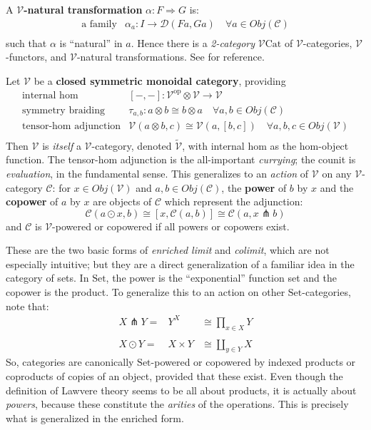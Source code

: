 \documentclass[a4paper,UKenglish]{article}
\theoremstyle{definition}
\newcommand{\Set}{\mathrm{Set}}
\newcommand{\Cat}{\mathrm{Cat}}
\newcommand{\op}{\mathrm{op}}
\newcommand{\V}{\mathscr{V}}
\newcommand{\D}{\mathscr{D}}
\newcommand{\C}{\mathscr{C}}
\newcommand{\pfk}{\pitchfork}
\begin{document}
A \textbf{$\V$-natural transformation} $\alpha: F \Rightarrow G$ is:
\[\begin{array}{rl}
\text{a family} & \alpha_a: I \to \D(Fa,Ga) \quad \forall a \in Obj(\C)\\
\end{array}\]
such that $\alpha$ is ``natural'' in $a$. Hence there is a \textit{2-category} \textbf{$\V\Cat$} of $\V$-categories, $\V$-functors, and $\V$-natural transformations. See \cite{enrich} for reference.

Let $\V$ be a \textbf{closed symmetric monoidal category}, providing
\[\begin{array}{rl}
\text{internal hom} & [-,-]:\V^\op\otimes \V \to \V\\
\text{symmetry braiding} & \tau_{a,b}:a\otimes b\cong b\otimes a \quad \forall a,b \in Obj(\C)\\
\text{tensor-hom adjunction} & \V(a\otimes b,c) \cong \V(a,[b,c]) \quad \forall a,b,c \in Obj(\V)\\
\end{array}\]
Then $\V$ is \textit{itself} a $\V$-category, denoted $\tilde{\V}$, with internal hom as the hom-object function. The tensor-hom adjunction is the all-important \textit{currying}; the counit is \textit{evaluation}, in the fundamental sense. This generalizes to an \textit{action} of $\V$ on any $\V$-category $\C$: for $x \in Obj(\V)$ and $a,b \in Obj(\C)$, the \textbf{power} of $b$ by $x$ and the \textbf{copower} of $a$ by $x$ are objects of $\C$ which represent the adjunction:
\begin{equation}\label{eq:co-power}
	\C(a\odot x,b) \cong \left[x, \C(a,b)\right] \cong \C(a,x\pfk b)
\end{equation}
and $\C$ is $\V$-powered or copowered if all powers or copowers exist.

These are the two basic forms of \textit{enriched limit} and \textit{colimit}, which are not especially intuitive; but they are a direct generalization of a familiar idea in the category of sets. In $\Set$, the power is the ``exponential'' function set and the copower is the product. To generalize this to an action on other $\Set$-categories, note that:
\[\begin{array}{lcr}
	X \pfk Y = & Y^X & \cong \prod_{x\in X}Y\\
	\\
	X \odot Y = & X \times Y & \cong \coprod_{y\in Y}X
\end{array}\]
So, categories are canonically $\Set$-powered or copowered by indexed products or coproducts of copies of an object, provided that these exist. Even though the definition of Lawvere theory seems to be all about products, it is actually about \textit{powers}, because these constitute the \textit{arities} of the operations. This is precisely what is generalized in the enriched form.
\end{document}
